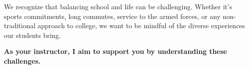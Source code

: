 \documentclass{ximera}
\author{Bart Snapp}
\begin{document}
\begin{question}
We recognize that balancing school and life can be challenging. Whether it's
sports commitments, long commutes, service to the armed forces, or any
non-traditional approach to college, we want to be mindful of the diverse
experiences our students bring.

\textbf{As your instructor, I aim to support you by understanding these challenges.} 
\begin{freeResponse}
\end{freeResponse}
\end{question}
\end{document}
